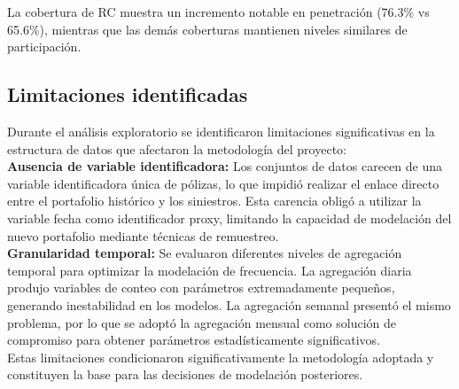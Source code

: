 La cobertura de RC muestra un incremento notable en penetración (76.3\% vs 65.6\%), mientras que las demás coberturas mantienen niveles similares de participación.

\subsection{Limitaciones identificadas}

Durante el análisis exploratorio se identificaron limitaciones significativas en la estructura de datos que afectaron la metodología del proyecto:\\

\textbf{Ausencia de variable identificadora:} Los conjuntos de datos carecen de una variable identificadora única de pólizas, lo que impidió realizar el enlace directo entre el portafolio histórico y los siniestros. Esta carencia obligó a utilizar la variable fecha como identificador proxy, limitando la capacidad de modelación del nuevo portafolio mediante técnicas de remuestreo.\\

\textbf{Granularidad temporal:} Se evaluaron diferentes niveles de agregación temporal para optimizar la modelación de frecuencia. La agregación diaria produjo variables de conteo con parámetros extremadamente pequeños, generando inestabilidad en los modelos. La agregación semanal presentó el mismo problema, por lo que se adoptó la agregación mensual como solución de compromiso para obtener parámetros estadísticamente significativos.\\

Estas limitaciones condicionaron significativamente la metodología adoptada y constituyen la base para las decisiones de modelación posteriores.

